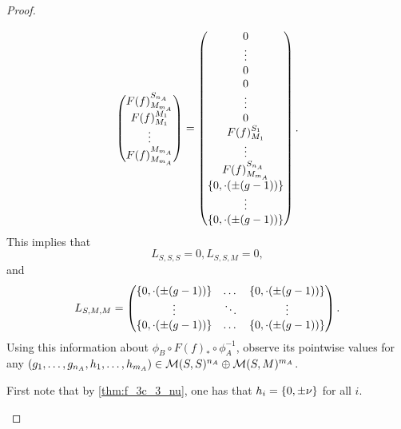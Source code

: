 \begin{proof}
\begin{enumerate}
{\[\begin{pmatrix}
                    F(f)_{M_{m_A}}^{S_{n_A}} \\
                    F(f)_{M_1}^{M_1} \\
                    \vdots \\
                    F(f)_{M_{m_A}}^{M_{m_A}}
                \end{pmatrix}
                = \begin{pmatrix}
                    0 \\
                    \vdots \\
                    0 \\
                    0 \\
                    \vdots \\
                    0 \\
                    F(f)_{M_1}^{S_1} \\
                    \vdots \\
                    F(f)_{M_{m_A}}^{S_{n_A}} \\
                    \left\{ 0, \cdot(\pm(g - 1)) \right\} \\
                    \vdots \\
                    \left\{ 0, \cdot(\pm(g - 1)) \right\}
                \end{pmatrix}.
            \]
            This implies that
            \[
                L_{S, S, S} = 0, L_{S, S, M} = 0,
            \]
            and
            \[
                L_{S, M, M} =
                \begin{pmatrix}
                    \left\{ 0, \cdot(\pm(g - 1)) \right\} & \dots & \left\{ 0, \cdot(\pm(g - 1)) \right\} \\
                    \vdots & \ddots & \vdots \\
                    \left\{ 0, \cdot(\pm(g - 1)) \right\} & \dots & \left\{ 0, \cdot(\pm(g - 1)) \right\}
                \end{pmatrix}.
            \]
            Using this information about \( \phi_B \circ F(f)_* \circ \phi_A^{-1} \), observe its pointwise values for any \( \left( g_1, \dots, g_{n_A}, h_1, \dots, h_{m_A} \right) \in {\mathcal{M}}(S, S)^{n_A} \oplus {\mathcal{M}}(S, M)^{m_A} \).
            
            First note that by \autoref{thm:f_3c_3_nu}, one has that \( h_i = \left\{ 0, \pm \nu \right\} \) for all \( i \).

}
\end{enumerate}
\end{proof}
